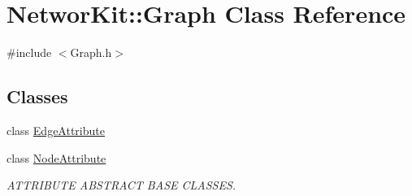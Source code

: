 \hypertarget{class_networ_kit_1_1_graph}{\section{Networ\-Kit\-:\-:Graph Class Reference}
\label{class_networ_kit_1_1_graph}
}


{\ttfamily \#include $<$Graph.\-h$>$}

\subsection*{Classes}
\begin{DoxyCompactItemize}
\item 
class \hyperlink{class_networ_kit_1_1_graph_1_1_edge_attribute}{Edge\-Attribute}
\item 
class \hyperlink{class_networ_kit_1_1_graph_1_1_node_attribute}{Node\-Attribute}
\begin{DoxyCompactList}\small\item\em A\-T\-T\-R\-I\-B\-U\-T\-E A\-B\-S\-T\-R\-A\-C\-T B\-A\-S\-E C\-L\-A\-S\-S\-E\-S. \end{DoxyCompactList}\end{DoxyCompactItemize}
